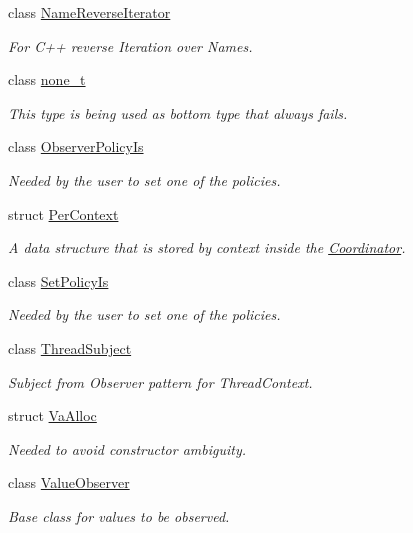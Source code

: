 \begin{DoxyCompactItemize}
class \hyperlink{classkdb_1_1NameReverseIterator}{Name\+Reverse\+Iterator}
\begin{DoxyCompactList}\small\item\em For C++ reverse Iteration over Names. \end{DoxyCompactList}\item 
class \hyperlink{classkdb_1_1none__t}{none\+\_\+t}
\begin{DoxyCompactList}\small\item\em This type is being used as bottom type that always fails. \end{DoxyCompactList}\item 
class \hyperlink{classkdb_1_1ObserverPolicyIs}{Observer\+Policy\+Is}
\begin{DoxyCompactList}\small\item\em Needed by the user to set one of the policies. \end{DoxyCompactList}\item 
struct \hyperlink{structkdb_1_1PerContext}{Per\+Context}
\begin{DoxyCompactList}\small\item\em A data structure that is stored by context inside the \hyperlink{classkdb_1_1Coordinator}{Coordinator}. \end{DoxyCompactList}\item 
class \hyperlink{classkdb_1_1SetPolicyIs}{Set\+Policy\+Is}
\begin{DoxyCompactList}\small\item\em Needed by the user to set one of the policies. \end{DoxyCompactList}\item 
class \hyperlink{classkdb_1_1ThreadSubject}{Thread\+Subject}
\begin{DoxyCompactList}\small\item\em Subject from Observer pattern for Thread\+Context. \end{DoxyCompactList}\item 
struct \hyperlink{structkdb_1_1VaAlloc}{Va\+Alloc}
\begin{DoxyCompactList}\small\item\em Needed to avoid constructor ambiguity. \end{DoxyCompactList}\item 
class \hyperlink{classkdb_1_1ValueObserver}{Value\+Observer}
\begin{DoxyCompactList}\small\item\em Base class for values to be observed. \end{DoxyCompactList}\item 

\end{DoxyCompactItemize}

